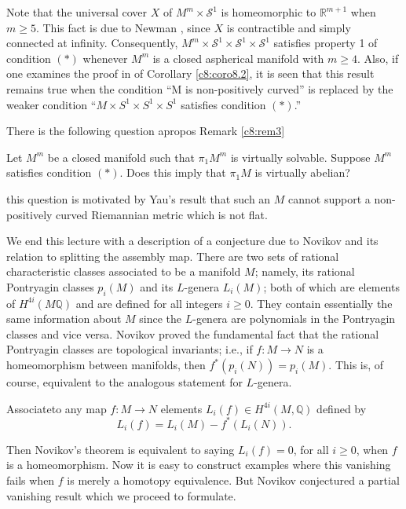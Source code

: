 Note that the universal cover $X$ of $M^m \times \mathcal{S}^1$ is
homeomorphic to $\mathbb{R}^{m+1}$ when $m \geq 5$. This fact is due
to Newman \cite{51}, since $X$ is contractible and simply connected at
infinity. Consequently, $M^m \times \mathcal{S}^1 \times \mathcal{S}^1
\times \mathcal{S}^1$ satisfies property 1 of condition $(*)$ whenever
$M^m$ is a closed aspherical manifold with $m \geq 4$. Also, if one
examines the proof in \cite{30} of Corollary \ref{c8:coro8.2}, it is
seen that this result remains true when the condition ``M is
non-positively curved''  is replaced by the weaker condition ``$M
\times S^1 \times S^1\times S^1$
satisfies condition $(*)$.''

There is the following question apropos Remark \ref{c8:rem3}

\begin{qus}\label{c8:qus8.3}
  Let $M^m$ be a closed manifold such that $\pi_1 M^m$ is virtually
  solvable. Suppose $M^m$ satisfies condition $(*)$. Does this imply
  that $\pi_1M$ is virtually abelian?
\end{qus}

this question is motivated by Yau's result \cite{98} that such an $M$
cannot support a non-positively curved Riemannian metric which is not
flat.

We end this lecture with a description of a conjecture due to Novikov
and its relation to splitting the assembly map. There are two sets of
rational characteristic classes associated to be a manifold $M$;
namely, its rational Pontryagin classes $p_i (M)$ and its $L$-genera
$L_i (M)$; both of which are elements of $H^{4i} (M\mathbb{Q})$ and
are defined for all integers $i \geq 0$. They contain essentially the
same information about $M$ since the $L$-genera are polynomials in the
Pontryagin classes and vice versa. Novikov \cite{78} proved the
fundamental fact that the rational Pontryagin classes are topological
invariants; i.e.,  if $f: M \to N$ is a homeomorphism between
manifolds, then $f^* (p_i (N))= p_i (M)$. This is, of course,
equivalent to the analogous statement for $L$-genera.

Associate\pageoriginale to any map $f: M \to N$ elements $L_i (f) \in
H^{4i} (M, \mathbb{Q})$ defined by 
$$
L_i (f) = L_i (M) - f^* (L_i (N)).
$$

Then Novikov's theorem is equivalent to saying $L_i (f)=0$, for all $i
\geq 0$, when $f$ is a homeomorphism. Now it is easy to construct
examples where this vanishing fails when $f$ is merely a homotopy
equivalence. But Novikov conjectured a partial vanishing result which
we proceed to formulate.

